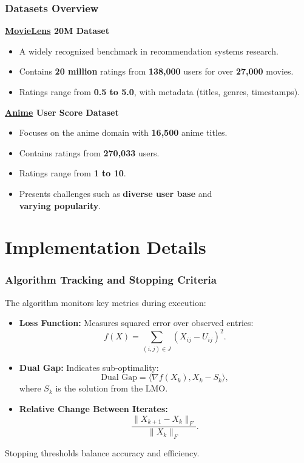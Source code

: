 \documentclass[12pt]{beamer}
\begin{document}
\begin{frame}
    \frametitle{Datasets Overview}

    \textbf{\href{https://grouplens.org/datasets/movielens/}{MovieLens} 20M Dataset}  
    \begin{itemize}
        \item A widely recognized benchmark in recommendation systems research.
        \item Contains \textbf{20 million} ratings from \textbf{138,000} users for over \textbf{27,000} movies.
        \item Ratings range from \textbf{0.5 to 5.0}, with metadata (titles, genres, timestamps).
    \end{itemize}


    \textbf{ \href{https://www.kaggle.com/datasets/dbdmobile/myanimelist-dataset/data?select=users-score-2023.csv}{Anime} User Score Dataset}  
    \begin{itemize}
        \item Focuses on the anime domain with \textbf{16,500} anime titles.
        \item Contains ratings from \textbf{270,033} users.
        \item Ratings range from \textbf{1 to 10}.
        \item Presents challenges such as \textbf{diverse user base} and \\
        \textbf{varying popularity}.
       
    \end{itemize}
    
\end{frame}

\section{Implementation Details}

\begin{frame}
    \frametitle{Algorithm Tracking and Stopping Criteria}

    The algorithm monitors key metrics during execution:

    \begin{itemize}
        \item \textbf{Loss Function:} Measures squared error over observed entries:
        \[
        f(X) = \sum_{(i,j) \in J} (X_{ij} - U_{ij})^2.
        \]

        \item \textbf{Dual Gap:} Indicates sub-optimality:
        \[
        \text{Dual Gap} = \langle \nabla f(X_k), X_k - S_k \rangle,
        \]
        where \( S_k \) is the solution from the LMO.

        \item \textbf{Relative Change Between Iterates:}
        \[
        \frac{\|X_{k+1} - X_k\|_F}{\|X_k\|_F}.
        \]
    \end{itemize}

    \vspace{0.3cm}
    Stopping thresholds balance accuracy and efficiency.
\end{frame}
\end{document}
